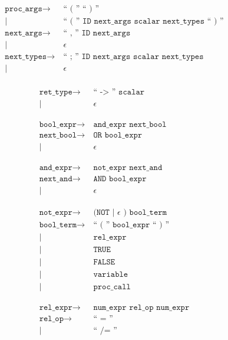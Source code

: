 \begin{align*}
	\phantom{0}\\
	\texttt{proc\_args}
	\rightarrow&\ \texttt{`` ( '' `` ) ''}\\
            |&\ \texttt{`` ( '' ID next\_args scalar next\_types `` ) ''}\\
	\texttt{next\_args}
	\rightarrow&\ \texttt{`` , '' ID next\_args}\\
            |&\ \epsilon\\
	\texttt{next\_types}
	\rightarrow&\ \texttt{`` ; '' ID next\_args scalar next\_types}\\
            |&\ \epsilon\\
\end{align*}

\begin{align*}
	\texttt{ret\_type}
	\rightarrow&\ \texttt{`` -> '' scalar}\\
            |&\ \epsilon\\
	\phantom{0}\\
	\texttt{bool\_expr}
	\rightarrow&\ \texttt{and\_expr next\_bool}\\
	\texttt{next\_bool}
	\rightarrow&\ \texttt{OR bool\_expr}\\
            |&\ \epsilon\\
	\phantom{0}\\
	\texttt{and\_expr}
	\rightarrow&\ \texttt{not\_expr next\_and}\\
	\texttt{next\_and}
	\rightarrow&\ \texttt{AND bool\_expr}\\
            |&\ \epsilon\\
	\phantom{0}\\
	\texttt{not\_expr}
	\rightarrow&\ \texttt{(NOT | } \epsilon \texttt{ ) bool\_term}\\
	\texttt{bool\_term}
	\rightarrow&\ \texttt{`` ( '' bool\_expr `` ) ''}\\
            |&\ \texttt{rel\_expr}\\
            |&\ \texttt{TRUE}\\
            |&\ \texttt{FALSE}\\
            |&\ \texttt{variable}\\
            |&\ \texttt{proc\_call}\\
	\phantom{0}\\
	\texttt{rel\_expr}
	\rightarrow&\ \texttt{num\_expr rel\_op num\_expr}\\
	\texttt{rel\_op}
	\rightarrow&\ \texttt{`` = ''}\\
            |&\ \texttt{`` /= ''}\\

\end{align*}
